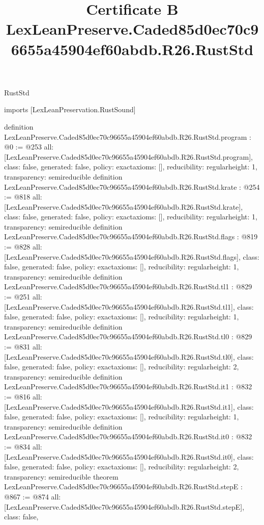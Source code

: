 \begin{lexlean}{RustStd}
\title{Certificate B LexLeanPreserve.Caded85d0ec70c96655a45904ef60abdb.R26.RustStd}
\begin{coremodule}
imports [LexLeanPreservation.RustSound]

definition LexLeanPreserve.Caded85d0ec70c96655a45904ef60abdb.R26.RustStd.program : @0 := @253 {
  all: [LexLeanPreserve.Caded85d0ec70c96655a45904ef60abdb.R26.RustStd.program],
  class: false,
  generated: false,
  policy: exact{axioms: []},
  reducibility: regular{height: 1},
  transparency: semireducible
}
definition LexLeanPreserve.Caded85d0ec70c96655a45904ef60abdb.R26.RustStd.krate : @254 := @818 {
  all: [LexLeanPreserve.Caded85d0ec70c96655a45904ef60abdb.R26.RustStd.krate],
  class: false,
  generated: false,
  policy: exact{axioms: []},
  reducibility: regular{height: 1},
  transparency: semireducible
}
definition LexLeanPreserve.Caded85d0ec70c96655a45904ef60abdb.R26.RustStd.flags : @819 := @828 {
  all: [LexLeanPreserve.Caded85d0ec70c96655a45904ef60abdb.R26.RustStd.flags],
  class: false,
  generated: false,
  policy: exact{axioms: []},
  reducibility: regular{height: 1},
  transparency: semireducible
}
definition LexLeanPreserve.Caded85d0ec70c96655a45904ef60abdb.R26.RustStd.tl1 : @829 := @251 {
  all: [LexLeanPreserve.Caded85d0ec70c96655a45904ef60abdb.R26.RustStd.tl1],
  class: false,
  generated: false,
  policy: exact{axioms: []},
  reducibility: regular{height: 1},
  transparency: semireducible
}
definition LexLeanPreserve.Caded85d0ec70c96655a45904ef60abdb.R26.RustStd.tl0 : @829 := @831 {
  all: [LexLeanPreserve.Caded85d0ec70c96655a45904ef60abdb.R26.RustStd.tl0],
  class: false,
  generated: false,
  policy: exact{axioms: []},
  reducibility: regular{height: 2},
  transparency: semireducible
}
definition LexLeanPreserve.Caded85d0ec70c96655a45904ef60abdb.R26.RustStd.it1 : @832 := @816 {
  all: [LexLeanPreserve.Caded85d0ec70c96655a45904ef60abdb.R26.RustStd.it1],
  class: false,
  generated: false,
  policy: exact{axioms: []},
  reducibility: regular{height: 1},
  transparency: semireducible
}
definition LexLeanPreserve.Caded85d0ec70c96655a45904ef60abdb.R26.RustStd.it0 : @832 := @834 {
  all: [LexLeanPreserve.Caded85d0ec70c96655a45904ef60abdb.R26.RustStd.it0],
  class: false,
  generated: false,
  policy: exact{axioms: []},
  reducibility: regular{height: 2},
  transparency: semireducible
}
theorem LexLeanPreserve.Caded85d0ec70c96655a45904ef60abdb.R26.RustStd.stepE : @867 := @874 {
  all: [LexLeanPreserve.Caded85d0ec70c96655a45904ef60abdb.R26.RustStd.stepE],
  class: false,
}
\end{coremodule}
\end{lexlean}

